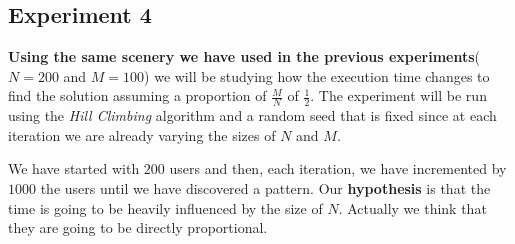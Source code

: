 \documentclass[12]{article}
\begin{document}
%
%
%            



\subsection{Experiment 4}
\textbf{Using the same scenery we have used in the previous experiments}($N=200$ and $M=100$) we will be studying how the execution time changes to find the solution  assuming a proportion of $\frac{M}{N}$ of $\frac{1}{2}$. The experiment will be run using the     
 \textit{Hill Climbing} algorithm and a random seed that is fixed since at each iteration we are already varying the sizes of $N$ and $M$.

We have started with $200$ users and then, each iteration, we have incremented by $1000$ the users until we have discovered a pattern. Our \textbf{hypothesis} is that the time is going to be heavily influenced by the size of $N$. Actually we think that they are going to be directly proportional. 
\end{document}
